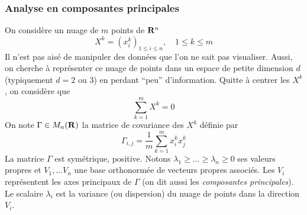 \subsubsection{Analyse en composantes principales}
On considère un nuage de $m$ points de $\mathbf{R}^{n}$ 
\begin{displaymath}
X^k = (x^k_i)_{1 \leq i \leq n}, \quad 1 \leq k \leq m
\end{displaymath}
Il n'est pas aisé de manipuler des données que l'on ne sait pas visualiser.
Aussi, on cherche à représenter ce nuage de points dans un espace de petite
dimension $d$ (typiquement $d=2$ ou 3) en perdant ``peu'' d'information.
Quitte à centrer les $X^k$, on considère que
$$\displaystyle\sum_{k=1}^m X^k = 0$$
On note $\Gamma \in M_n(\mathbf{R})$ la matrice de covariance des $X^k$ définie par
\begin{displaymath}
\Gamma_{i,j} = \frac{1}{m} \sum_{k=1}^{m} x^k_i x^k_j
\end{displaymath}
La matrice ${\Gamma}$ est symétrique, positive. Notons $\lambda_1 \geq \dots \geq
\lambda_n \geq 0$ ses valeurs propres et $V_1,\dots V_n$ une base orthonormée
de vecteurs propres associés. Les $V_i$ représentent les axes principaux de
$\Gamma$ (on dit aussi les \emph{composantes principales}). Le scalaire
$\lambda_i$ est
la variance (ou dispersion) du nuage de points dans la direction $V_i$. 

